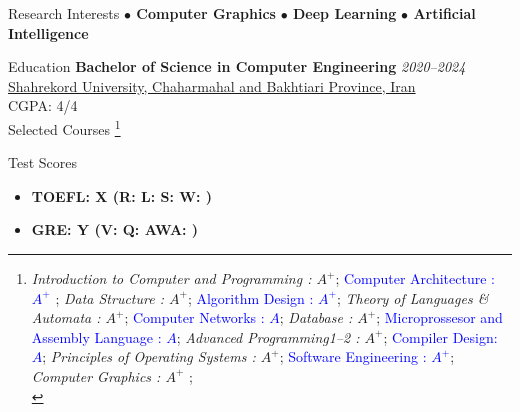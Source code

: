 \documentclass{resume} %
\begin{document}
    \begin{rSection}{Research Interests}
        \textbf{$\bullet$ Computer Graphics} \hspace*{16pt}
        \textbf{$\bullet$ Deep Learning}\hspace*{16pt}
        \textbf{$\bullet$ Artificial Intelligence}\hspace*{16pt}
    \end{rSection}

    \begin{rSection}{Education}
    {\bf Bachelor of Science in Computer Engineering}
        \hfill {\em 2020--2024} \\ %
        \href{https://sku.ac.ir}{\textcolor{coolblack}{Shahrekord University, Chaharmahal and Bakhtiari Province, Iran}}\\ %
        CGPA: 4/4\\ %
        Selected Courses
        \footnote{\textit{Introduction to Computer and Programming : $A^{+}$};
        \textcolor{blue}{Computer Architecture : $A^{+}$ }; \textit{Data Structure : $A^{+}$};
        \textcolor{blue}{Algorithm Design : $A^{+}$}; \textit{Theory of Languages \& Automata : $A^{+}$};
        \textcolor{blue}{Computer Networks : $A$}; \textit{Database : $A^{+}$};
        \textcolor{blue}{Microprossesor and Assembly Language : $A$}; \textit{Advanced Programming1--2 : $A^{+}$};
        \textcolor{blue}{Compiler Design: $A$}; \textit{Principles of Operating Systems : $A^{+}$};
        \textcolor{blue}{Software Engineering : $A^{+}$}; \textit{Computer Graphics : $A^{+}$ }; \\}
    \end{rSection}

    \begin{rSection}{Test Scores}
        \begin{itemize}{\bfseries}
            \item {\bfseries TOEFL: X (R:  L:  S:  W: )}
            \item {\bfseries GRE:   Y (V:  Q:  AWA: )}
        \end{itemize}
    \end{rSection}
\end{document}
